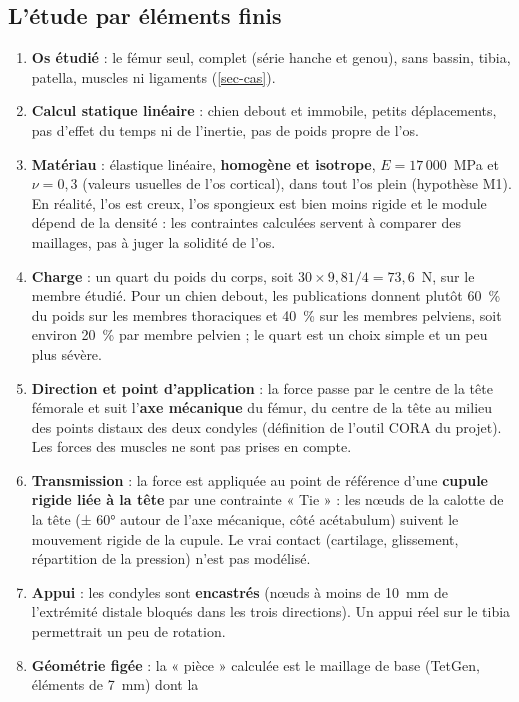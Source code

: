 \documentclass[11pt,a4paper]{article}
\begin{document}
\subsection{L'étude par éléments finis}

\begin{enumerate}[label=E\arabic*.]
  \item \textbf{Os étudié} : le fémur seul, complet (série hanche et genou), sans bassin, tibia, patella, muscles ni
  ligaments (\cref{sec-cas}).
  \item \textbf{Calcul statique linéaire} : chien debout et immobile, petits déplacements, pas d'effet du temps ni de
  l'inertie, pas de poids propre de l'os.
  \item \textbf{Matériau} : élastique linéaire, \textbf{homogène et isotrope}, $E = 17\,000$~MPa et $\nu = 0{,}3$ (valeurs
  usuelles de l'os cortical), dans tout l'os plein (hypothèse M1). En réalité, l'os est creux, l'os spongieux est bien
  moins rigide et le module dépend de la densité : les contraintes calculées servent à comparer des maillages, pas à
  juger la solidité de l'os.
  \item \textbf{Charge} : un quart du poids du corps, soit $30 \times 9{,}81 / 4 = 73{,}6$~N, sur le membre étudié. Pour
  un chien debout, les publications donnent plutôt 60~\% du poids sur les membres thoraciques et 40~\% sur les membres
  pelviens, soit environ 20~\% par membre pelvien \cite{bmc2020} ; le quart est un choix simple et un peu plus sévère.
  \item \textbf{Direction et point d'application} : la force passe par le centre de la tête fémorale et suit
  l'\textbf{axe mécanique} du fémur, du centre de la tête au milieu des points distaux des deux condyles (définition
  de l'outil CORA du projet). Les forces des muscles ne sont pas prises en compte.
  \item \textbf{Transmission} : la force est appliquée au point de référence d'une \textbf{cupule rigide liée à la
  tête} par une contrainte « Tie » : les nœuds de la calotte de la tête (± 60° autour de l'axe mécanique, côté
  acétabulum) suivent le mouvement rigide de la cupule. Le vrai contact (cartilage, glissement, répartition de la
  pression) n'est pas modélisé.
  \item \textbf{Appui} : les condyles sont \textbf{encastrés} (nœuds à moins de 10~mm de l'extrémité distale bloqués
  dans les trois directions). Un appui réel sur le tibia permettrait un peu de rotation.
  \item \textbf{Géométrie figée} : la « pièce » calculée est le maillage de base (TetGen, éléments de 7~mm) dont la

\end{enumerate}
\end{document}
